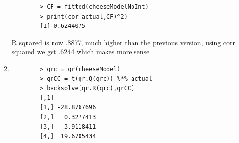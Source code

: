 \documentclass[11pt]{article}
\begin{document}
\begin{enumerate}
\begin{enumerate}
\begin{verbatim}
		> CF = fitted(cheeseModelNoInt)
		> print(cor(actual,CF)^2)
		[1] 0.6244075 	
	\end{verbatim}
	 R squared is now .8877, much higher than the previous version, using corr squared we get .6244 which makes more sense
	\item        
	\begin{verbatim}
		> qrc = qr(cheeseModel)
		> qrCC = t(qr.Q(qrc)) %*% actual
		> backsolve(qr.R(qrc),qrCC)
		[,1]
		[1,] -28.8767696
		[2,]   0.3277413
		[3,]   3.9118411
		[4,]  19.6705434
	\end{verbatim}    

\end{enumerate}
\end{enumerate}
\end{document}
